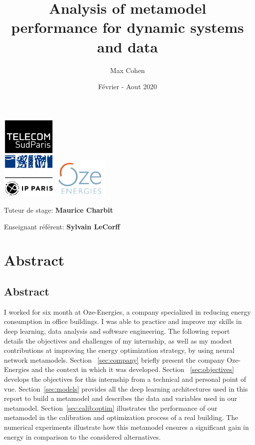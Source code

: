 \documentclass[12pt]{article}
\title{Analysis of metamodel performance for dynamic systems and data}
\author{Max Cohen}
\date{Février - Aout 2020}
\begin{document}
\begin{titlepage}

    \maketitle

    \begin{center}
        \includegraphics[width=0.2\textwidth]{IPP_Endos_TelecomSudParis_RVB.png}
        \includegraphics[width=0.2\textwidth]{oze_logo.png}

        \vspace{2cm}

        Tuteur de stage: \textbf{Maurice Charbit}
        \vspace{.5cm}

        Enseignant référent: \textbf{Sylvain LeCorff}
        
    \end{center}


\end{titlepage}

\tableofcontents

\section{Abstract}
\subsection{Abstract}
I worked for six month at Oze-Energies, a company specialized in reducing energy consumption in office buildings. I  was  able  to  practice  and  improve  my skills in deep learning, data analysis and software engineering. The following report details the objectives and challenges of my internship, as well as my modest contributions at improving the energy optimization strategy, by using neural network metamodels. Section ~\ref{sec:company} briefly present the company Oze-Energies and the context in which it was developed. Section ~\ref{sec:objectives} develops the objectives for this internship from a technical and personal point of vue. Section~\ref{sec:models} provides all the deep learning architectures used in this report to build a metamodel and describes the data and variables used in our metamodel. Section~\ref{sec:calib:optim} illustrates the performance of our metamodel in the calibration and optimization process of a real building. The numerical experiments illustrate how this metamodel ensures a significant gain in energy in comparison to the considered alternatives.
\end{document}
